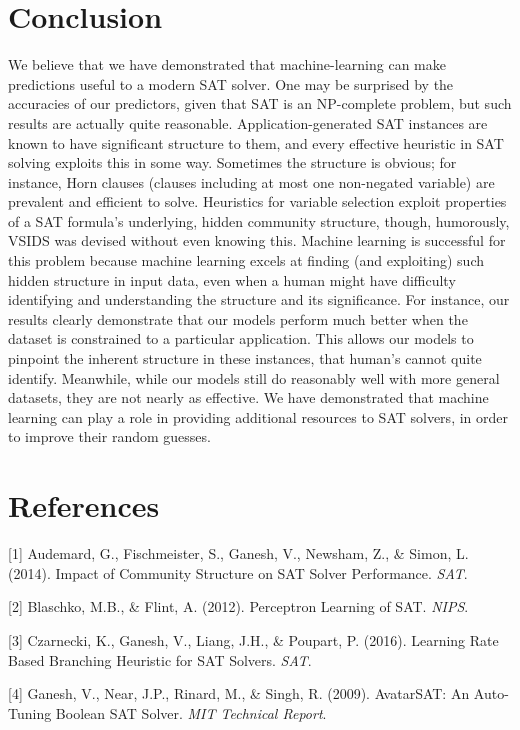 \documentclass{article}
\begin{document}
\section*{Conclusion}
We believe that we have demonstrated that machine-learning can make predictions
useful to a modern SAT solver. One may be surprised by the accuracies of our
predictors, given that SAT is an NP-complete problem, but such results are
actually quite reasonable. Application-generated SAT instances are known to have
significant structure to them, and every effective heuristic in SAT solving
exploits this in some way. Sometimes the structure is obvious; for instance,
Horn clauses (clauses including at most one non-negated variable) are prevalent
and efficient to solve. Heuristics for variable selection exploit properties of
a SAT formula's underlying, hidden community structure, though, humorously,
VSIDS was devised without even knowing this. Machine learning is successful for
this problem because machine learning excels at finding (and exploiting) such
hidden structure in input data, even when a human might have difficulty
identifying and understanding the structure and its significance. For instance,
our results clearly demonstrate that our models perform much better when
the dataset is constrained to a particular application. This allows our models
to pinpoint the inherent structure in these instances, that human's cannot quite
identify. Meanwhile, while our models still do reasonably well with more general
datasets, they are not nearly as effective. We have demonstrated that machine
learning can play a role in providing additional resources to SAT solvers, in
order to improve their random guesses.

\section*{References}\label{references}

\small

[1] Audemard, G., Fischmeister, S., Ganesh, V., Newsham, Z., \& Simon, L. (2014).
Impact of Community Structure on SAT Solver Performance. \textit{SAT}.

[2] Blaschko, M.B., \& Flint, A. (2012).
Perceptron Learning of SAT. \textit{NIPS}.

[3] Czarnecki, K., Ganesh, V., Liang, J.H., \& Poupart, P. (2016).
Learning Rate Based Branching Heuristic for SAT Solvers. \textit{SAT}.

[4] Ganesh, V., Near, J.P., Rinard, M., \& Singh, R. (2009).
AvatarSAT: An Auto-Tuning Boolean SAT Solver. \textit{MIT Technical Report}.
\end{document}

